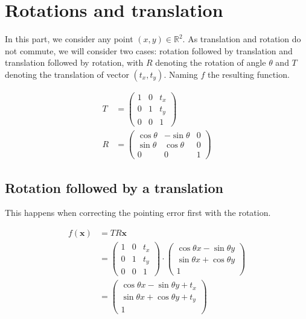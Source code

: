 \documentclass[paper=a4, fontsize=11pt, onecolumn, tikz, dvipsnames, svgnames, x11names]{article}
\begin{document}
\appendix

\section{Rotations and translation}

In this part, we consider any point \((x, y) \in \mathbb{R}^2\). As translation and rotation do not commute, we will consider two cases: rotation followed by translation and translation followed by rotation, with \(R\) denoting the rotation of angle \(\theta\) and \(T\) denoting the translation of vector \((t_x, t_y)\). Naming \(f\) the resulting function.

\begin{align*}
    T &=
    \begin{pmatrix}
    1 & 0 & t_x \\
    0 & 1 & t_y \\
    0 & 0 & 1
    \end{pmatrix}
    \\
    R &=
    \begin{pmatrix}
    \cos \theta & -\sin \theta & 0 \\
    \sin \theta & \cos \theta & 0 \\
    0 & 0 & 1
    \end{pmatrix}
\end{align*}


\subsection{Rotation followed by a translation}
This happens when correcting the pointing error first with the rotation.

\begin{align*}
    f(\bm{x}) &= TR\bm{x} \\
    &=
    \begin{pmatrix}
    1 & 0 & t_x \\
    0 & 1 & t_y \\
    0 & 0 & 1
    \end{pmatrix}
    \cdot
    \begin{pmatrix}
    \cos \theta x - \sin \theta y \\
    \sin \theta x + \cos \theta y \\
    1
    \end{pmatrix}
    \\
    &=
    \begin{pmatrix}
    \cos \theta x - \sin \theta y + t_x\\
    \sin \theta x + \cos \theta y + t_y\\
    1
    \end{pmatrix}
\end{align*}
\end{document}
